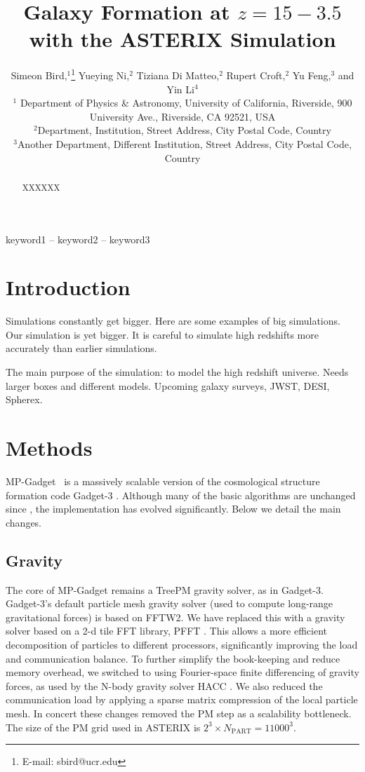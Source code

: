\documentclass[fleqn,usenatbib]{mnras}
\title[ASTERIX]{Galaxy Formation at $z=15-3.5$ with the ASTERIX Simulation}
\author[S.~Bird et al.]{
Simeon Bird,$^{1}$\thanks{E-mail: sbird@ucr.edu}
Yueying Ni,$^{2}$
Tiziana Di Matteo,$^{2}$
Rupert Croft,$^{2}$
Yu Feng,$^{3}$
and Yin Li$^{4}$
\\
$^{1}$ Department of Physics \& Astronomy, University of California, Riverside, 900 University Ave., Riverside, CA 92521, USA\\
$^{2}$Department, Institution, Street Address, City Postal Code, Country\\
$^{3}$Another Department, Different Institution, Street Address, City Postal Code, Country
}
\newcommand{\software}[1]{{\small #1}}
\newcommand{\mpgadget}{\software{MP-Gadget}}
\begin{document}
\label{firstpage}
\pagerange{\pageref{firstpage}--\pageref{lastpage}}
\maketitle

\begin{abstract}
XXXXXX
\end{abstract}

\begin{keywords}
keyword1 -- keyword2 -- keyword3
\end{keywords}



\section{Introduction}
Simulations constantly get bigger. Here are some examples of big simulations. Our simulation is yet bigger. It is careful to simulate high redshifts more accurately than earlier simulations.

The main purpose of the simulation:
to model the high redshift universe. Needs larger boxes and different models. Upcoming galaxy surveys, JWST, DESI, Spherex.

\section{Methods}

\mpgadget~\citep{MPGadget2018} is a massively scalable version of the cosmological structure formation code Gadget-3 \citep{Springel:2005}. Although many of the basic algorithms are unchanged since \cite{Feng:2016}, the implementation has evolved significantly. Below we detail the main changes.

\subsection{Gravity}
The core of MP-Gadget remains a TreePM gravity solver, as in Gadget-3. Gadget-3's default particle mesh gravity solver
(used to compute long-range gravitational forces) is based on FFTW2. We have replaced this with a gravity solver based on a 2-d tile FFT library, \software{PFFT} \citep{doi:10.1137/120885887}.
This allows a more efficient decomposition of particles to different processors, significantly improving the
load and communication balance. To further simplify the book-keeping and reduce memory overhead,
we switched to using Fourier-space finite differencing of gravity forces, as used by the N-body gravity solver HACC \citep{2014arXiv1410.2805H}.
We also reduced the communication load by applying a sparse matrix compression of the local particle mesh.
In concert these changes removed the PM step as a scalability bottleneck. The size of the PM grid used in ASTERIX is $2^3\times N_\mathrm{PART} = 11000^3$.
\end{document}
